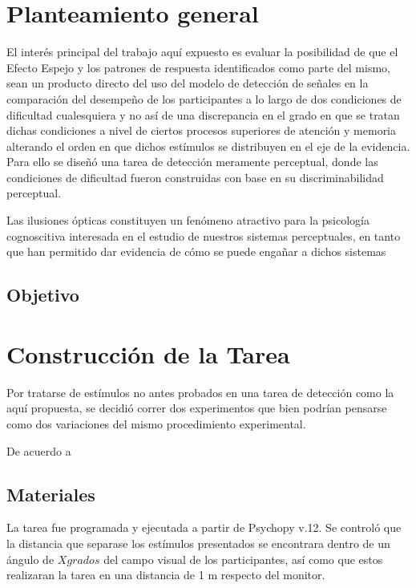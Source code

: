 \section{Planteamiento general}

El interés principal del trabajo aquí expuesto es evaluar la posibilidad de que el Efecto Espejo y los patrones de respuesta identificados como parte del mismo, sean un producto directo del uso del modelo de detección de señales en la comparación del desempeño de los participantes a lo largo de dos condiciones de dificultad cualesquiera y no así de una discrepancia en el grado en que se tratan dichas condiciones a nivel de ciertos procesos superiores de atención y memoria alterando el orden en que dichos estímulos se distribuyen en el eje de la evidencia. Para ello se diseñó una tarea de detección meramente perceptual, donde las condiciones de dificultad fueron construidas con base en su discriminabilidad perceptual. 

Las ilusiones ópticas constituyen un fenómeno atractivo para la psicología cognoscitiva interesada en el estudio de nuestros sistemas perceptuales, en tanto que han permitido dar evidencia de cómo se puede engañar a dichos sistemas 

\subsection{Objetivo}


\section{Construcción de la Tarea}

Por tratarse de estímulos no antes probados en una tarea de detección como la aquí propuesta, se decidió correr dos experimentos que bien podrían pensarse como dos variaciones del mismo procedimiento experimental. 

De acuerdo a \parencite{Massaro1971}




\subsection{Materiales}
La tarea fue programada y ejecutada a partir de Psychopy v.12. Se controló que la distancia que separase los estímulos presentados se encontrara dentro de un ángulo de $X grados$ del campo visual de los participantes, así como que estos realizaran la tarea en una distancia de 1 m respecto del monitor.

